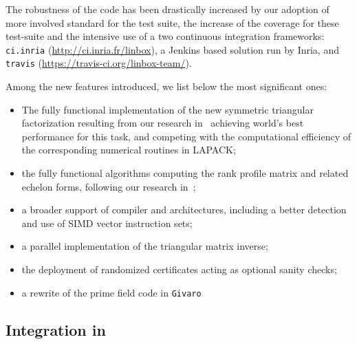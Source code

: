 \documentclass{deliverablereport}
\begin{document}
The robustness of the code has been drastically increased by our adoption of more
involved standard for the test suite, the increase of the coverage for these
test-suite and the intensive use of a two continuous integration frameworks:
\texttt{ci.inria} (\url{http://ci.inria.fr/linbox}), a Jenkins based solution run by Inria, and
\texttt{travis} (\url{https://travis-ci.org/linbox-team/}).

Among the new features introduced, we list below the most significant ones:
\begin{itemize}
\item The fully functional implementation of the new symmetric triangular
  factorization resulting from our research in~\cite{DuPe18} achieving world's
  best performance for this task, and competing with the computational
  efficiency of the corresponding numerical routines in LAPACK;
\item the fully functional algorithms computing the rank profile matrix and
  related echelon forms, following our research in~\cite{DPS17};
\item a broader support of compiler and architectures, including a better
  detection and use of SIMD vector instruction sets;
\item a parallel implementation of the triangular matrix inverse;
\item the deployment of randomized certificates acting as optional sanity checks;
\item a rewrite of the prime field code in \texttt{Givaro}
\end{itemize}
\subsection{Integration in \Sage}
\end{document}
